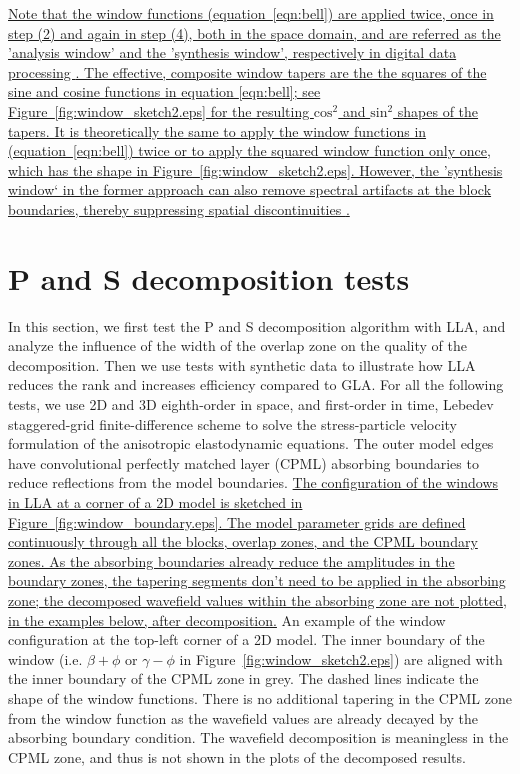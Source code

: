 \documentclass[manuscript,ulem,graphix,revised]{geophysics}
\begin{document}
\marginnote{[2, 17]}\uline{Note that the window functions (equation~\ref{eqn:bell}) are applied twice, once in step (2) and again in step (4), both in the space domain, and are referred as the 'analysis window' and the 'synthesis window', respectively in digital data processing \mbox{\citep{julius11}}. The effective, composite window tapers are the the squares of the sine and cosine functions in equation \ref{eqn:bell}; see Figure~\ref{fig:window_sketch2.eps} for the resulting $\mathrm{cos^2}$ and $\mathrm{sin^2}$ shapes of the tapers. It is theoretically the same to apply the window functions in (equation~\ref{eqn:bell}) twice or to apply the squared window function only once, which has the shape in Figure~\ref{fig:window_sketch2.eps}. However, the 'synthesis window` in the former approach can also remove spectral artifacts at the block boundaries, thereby suppressing spatial discontinuities \mbox{\citep{julius11}}. }

\section{P and S decomposition tests}
\indent\indent
In this section, we first test the P and S decomposition algorithm with LLA, and analyze the influence of the width of the overlap zone on the quality of the decomposition. Then we use tests with synthetic data to illustrate how LLA reduces the rank and increases efficiency compared to GLA.
For all the following tests, we use 2D and 3D eighth-order in space, and first-order in time, Lebedev staggered-grid finite-difference scheme \citep{vadim10} to solve the stress-particle velocity formulation of the anisotropic elastodynamic equations. The outer model edges have convolutional perfectly matched layer (CPML) absorbing boundaries \citep{komatitsch07} to reduce reflections from the model boundaries. 
\marginnote{[17]}\uline{The configuration of the windows in LLA at a corner of a 2D model is sketched in Figure~\ref{fig:window_boundary.eps}. The model parameter grids are defined continuously through all the blocks, overlap zones, and the CPML boundary zones. As the absorbing boundaries already reduce the amplitudes in the boundary zones, the tapering segments don't need to be applied in the absorbing zone; the decomposed wavefield values within the absorbing zone are not plotted, in the examples below, after decomposition.}
 {
An example of the window configuration at the top-left corner of a 2D model. 
The inner boundary of the window (i.e. $\beta+\phi$ or $\gamma-\phi$ in Figure~\ref{fig:window_sketch2.eps}) are aligned with the inner boundary of the CPML zone in grey.
The dashed lines indicate the shape of the window functions. There is no additional tapering in the CPML zone from the window function as the wavefield values are already decayed by the absorbing boundary condition. The wavefield decomposition is meaningless in the CPML zone, and thus is not shown in the plots of the decomposed results.
}
\end{document}
